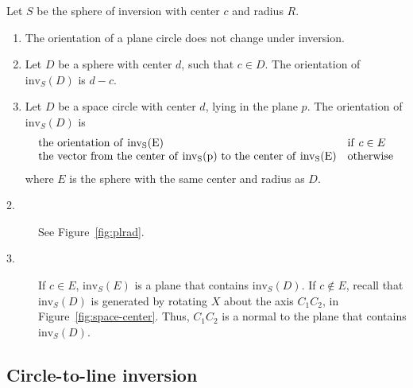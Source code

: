 \begin{theorem}
\label{thm:orient}
Let $S$ be the sphere of inversion with center $c$ and radius $R$.
\begin{enumerate}

\item
The orientation of a plane circle does not change under inversion.

\item
Let $D$ be a sphere with center $d$, such that $c \in D$.
The orientation of $\mbox{inv}_{S}(D)$ is $d-c$.

\item
Let $D$ be a space circle with center $d$, 
lying in the plane $p$.
The orientation of $\mbox{inv}_{S}(D)$ is 
\[
\begin{array}{ll}
\rm{the\ orientation\ of\ } \mbox{inv}_{S}($E$)	&	{\rm if\ } c \in E \\
\rm{the\ vector\ from\ the\ center\ of\ } \mbox{inv}_{S}($p$)
\rm{\ to\ the\ center\ of\ } \mbox{inv}_{S}(E)
						&	{\rm otherwise}
\end{array}
\]
%
where $E$ is the sphere with the same center and radius as $D$.
\end{enumerate}
\end{theorem}
\begin{description}
\item[2.]
See Figure~\ref{fig:plrad}. %
\item[3.]
If $c \in E$, $\mbox{inv}_{S}(E)$ is a plane that contains $\mbox{inv}_{S}(D)$.
If $c \not \in E$, 
recall that $\mbox{inv}_{S}(D)$ is generated by rotating $X$ about
the axis $C_{1}C_{2}$, in Figure~\ref{fig:space-center}.
Thus, $C_{1}C_{2}$ is a normal to the plane that contains $\mbox{inv}_{S}(D)$.
\end{description}
\QED

\subsection{Circle-to-line inversion}


